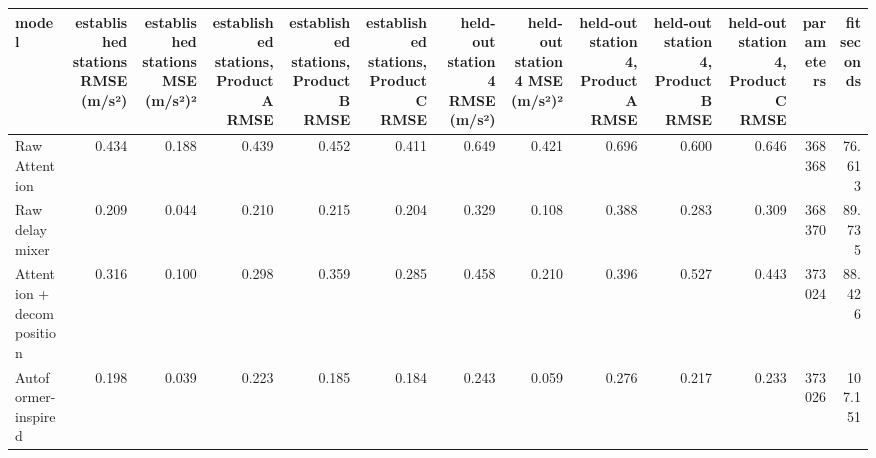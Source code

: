 \begin{tabular}{lrrrrrrrrrrrr}
\toprule
model & established stations RMSE (m/s²) & established stations MSE (m/s²)² & established stations, Product A RMSE & established stations, Product B RMSE & established stations, Product C RMSE & held-out station 4 RMSE (m/s²) & held-out station 4 MSE (m/s²)² & held-out station 4, Product A RMSE & held-out station 4, Product B RMSE & held-out station 4, Product C RMSE & parameters & fit seconds \\
\midrule
Raw Attention & 0.434 & 0.188 & 0.439 & 0.452 & 0.411 & 0.649 & 0.421 & 0.696 & 0.600 & 0.646 & 368368 & 76.613 \\
Raw delay mixer & 0.209 & 0.044 & 0.210 & 0.215 & 0.204 & 0.329 & 0.108 & 0.388 & 0.283 & 0.309 & 368370 & 89.735 \\
Attention + decomposition & 0.316 & 0.100 & 0.298 & 0.359 & 0.285 & 0.458 & 0.210 & 0.396 & 0.527 & 0.443 & 373024 & 88.426 \\
Autoformer-inspired & 0.198 & 0.039 & 0.223 & 0.185 & 0.184 & 0.243 & 0.059 & 0.276 & 0.217 & 0.233 & 373026 & 107.151 \\
\bottomrule
\end{tabular}
